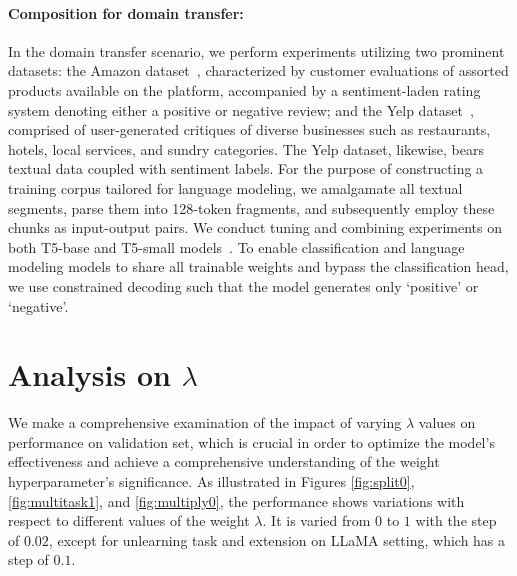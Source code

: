\paragraph{Composition for domain transfer:}

In the domain transfer scenario, we perform experiments utilizing two prominent datasets: the Amazon dataset~\citep{mcauley2013hidden}, characterized by customer evaluations of assorted products available on the platform, accompanied by a sentiment-laden rating system denoting either a positive or negative review; and the Yelp dataset~\citep{zhang2015character}, comprised of user-generated critiques of diverse businesses such as restaurants, hotels, local services, and sundry categories. The Yelp dataset, likewise, bears textual data coupled with sentiment labels. 
For the purpose of constructing a training corpus tailored for language modeling, we amalgamate all textual segments, parse them into 128-token fragments, and subsequently employ these chunks as input-output pairs.
We conduct tuning and combining experiments on both T5-base and T5-small models~\citep{raffel2020exploring}. 
To enable classification and language modeling models to share all trainable weights and bypass the classification head, we use constrained decoding such that the model generates only `positive' or `negative'.




\section{Analysis on $\lambda$}
\label{sec:apx_lambda}

We make a comprehensive examination of the impact of varying $\lambda$ values on performance on validation set, which is crucial in order to optimize the model's effectiveness and achieve a comprehensive understanding of the weight hyperparameter's significance. 
As illustrated in Figures \ref{fig:split0}, \ref{fig:multitask1}, and \ref{fig:multiply0}, the performance shows variations with respect to different values of the weight $\lambda$. 
It is varied from $0$ to $1$ with the step of $0.02$, except for unlearning task and extension on LLaMA setting, which has a step of $0.1$. 

